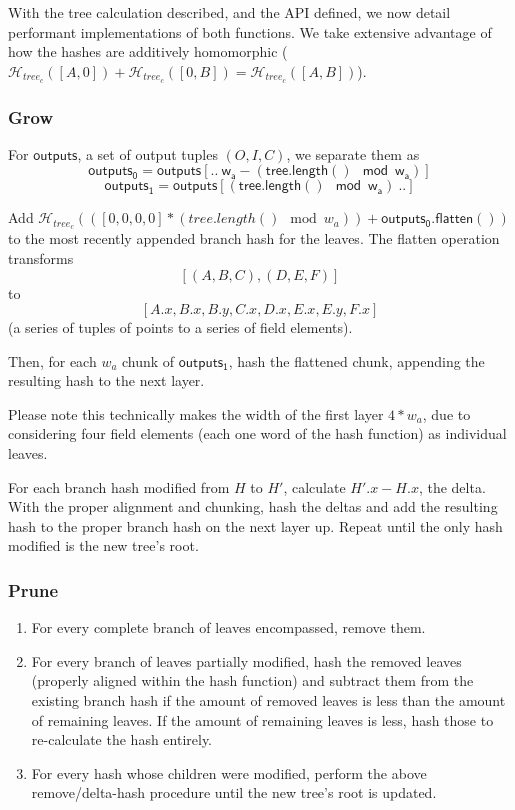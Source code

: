 \documentclass[]{article}
\begin{document}
With the tree calculation described, and the API defined, we now detail performant implementations of both functions. We take extensive advantage of how the hashes are additively homomorphic ($\mathcal{H}_{tree_c}([A, 0]) + \mathcal{H}_{tree_c}([0, B]) = \mathcal{H}_{tree_c}([A, B])$).

\subsubsection{Grow}

For $\mathsf{outputs}$, a set of output tuples $(O, I, C)$, we separate them as
$$
\mathsf{outputs_0} = \mathsf{outputs[.. ~w_a - (tree.length() \mod w_a)]}
$$
$$
\mathsf{outputs_1} = \mathsf{outputs[(tree.length() \mod w_a) ~..]}
$$

Add $\mathcal{H}_{tree_c}(([0, 0, 0, 0] * (tree.length() \mod w_a)) + \mathsf{outputs_0.flatten()})$ to the most recently appended branch hash for the leaves. The flatten operation transforms $$[(A, B, C), (D, E, F)]$$ to $$[
A.x, B.x, B.y, C.x,
D.x, E.x, E.y, F.x
]$$
(a series of tuples of points to a series of field elements).

Then, for each $w_a$ chunk of $\mathsf{outputs_1}$, hash the flattened chunk, appending the resulting hash to the next layer.

Please note this technically makes the width of the first layer $4 * w_a$, due to considering four field elements (each one word of the hash function) as individual leaves.

For each branch hash modified from $H$ to $H'$, calculate $H'.x - H.x$, the delta. With the proper alignment and chunking, hash the deltas and add the resulting hash to the proper branch hash on the next layer up. Repeat until the only hash modified is the new tree's root.

\subsubsection{Prune}

\begin{enumerate}
  \item For every complete branch of leaves encompassed, remove them.
  \item For every branch of leaves partially modified, hash the removed leaves (properly aligned within the hash function) and subtract them from the existing branch hash if the amount of removed leaves is less than the amount of remaining leaves. If the amount of remaining leaves is less, hash those to re-calculate the hash entirely.
  \item For every hash whose children were modified, perform the above remove/delta-hash procedure until the new tree's root is updated.
\end{enumerate}
\end{document}
